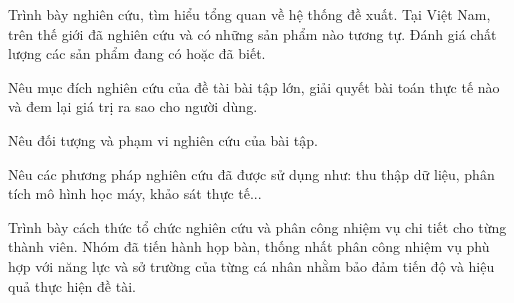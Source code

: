 
Trình bày nghiên cứu, tìm hiểu tổng quan về hệ thống đề xuất. Tại Việt Nam, trên thế giới đã nghiên cứu và có những sản phẩm nào tương tự. Đánh giá chất lượng các sản phẩm đang có hoặc đã biết.

Nêu mục đích nghiên cứu của đề tài bài tập lớn, giải quyết bài toán thực tế nào và đem lại giá trị ra sao cho người dùng.

Nêu đối tượng và phạm vi nghiên cứu của bài tập.

Nêu các phương pháp nghiên cứu đã được sử dụng như: thu thập dữ liệu, phân tích mô hình học máy, khảo sát thực tế...

Trình bày cách thức tổ chức nghiên cứu và phân công nhiệm vụ chi tiết cho từng thành viên. Nhóm đã tiến hành họp bàn, thống nhất phân công nhiệm vụ phù hợp với năng lực và sở trường của từng cá nhân nhằm bảo đảm tiến độ và hiệu quả thực hiện đề tài.

